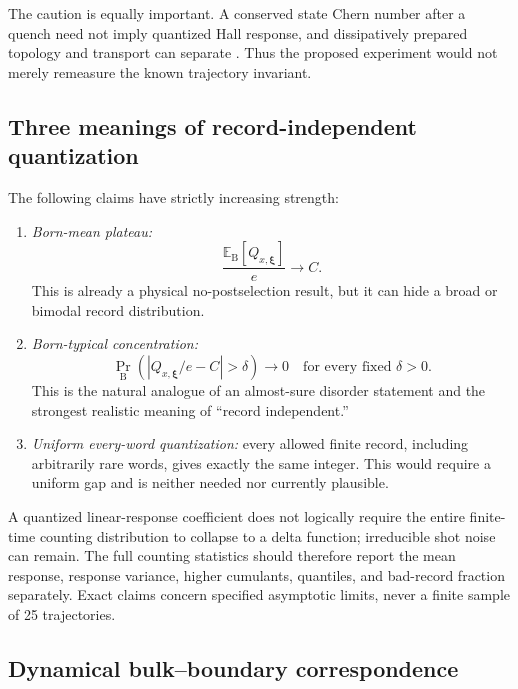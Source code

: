 \documentclass[aps,prb,onecolumn,nofootinbib,superscriptaddress]{revtex4-2}
\newcommand{\E}{\mathbb{E}}
\newcommand{\bxi}{\bm{\xi}}
\newcommand{\Born}{\mathrm{B}}
\begin{document}
The caution is equally important.  A conserved state Chern number after a
quench need not imply quantized Hall response, and dissipatively prepared
topology and transport can separate
\cite{CaioCooperBhaseen2016,ShavitGoldstein2020}.  Thus the proposed experiment
would not merely remeasure the known trajectory invariant.

\subsection{Three meanings of record-independent quantization}

The following claims have strictly increasing strength:
\begin{enumerate}
  \item \emph{Born-mean plateau:}
  \begin{equation}
    \frac{\E_{\Born}[Q_{x,\bxi}]}{e}\longrightarrow C.
    \label{eq:born-mean-pump}
  \end{equation}
  This is already a physical no-postselection result, but it can hide a broad
  or bimodal record distribution.
  \item \emph{Born-typical concentration:}
  \begin{equation}
    \Pr_{\Born}\!\left(
      \left|Q_{x,\bxi}/e-C\right|>\delta
    \right)\longrightarrow0
    \quad\text{for every fixed }\delta>0.
    \label{eq:record-concentration}
  \end{equation}
  This is the natural analogue of an almost-sure disorder statement and the
  strongest realistic meaning of ``record independent.''
  \item \emph{Uniform every-word quantization:} every allowed finite record,
  including arbitrarily rare words, gives exactly the same integer.  This
  would require a uniform gap and is neither needed nor currently plausible.
\end{enumerate}
A quantized linear-response coefficient does not logically require the entire
finite-time counting distribution to collapse to a delta function; irreducible
shot noise can remain.  The full counting statistics should therefore report
the mean response, response variance, higher cumulants, quantiles, and
bad-record fraction separately.  Exact claims concern specified asymptotic
limits, never a finite sample of 25 trajectories.

\subsection{Dynamical bulk--boundary correspondence}
\end{document}
